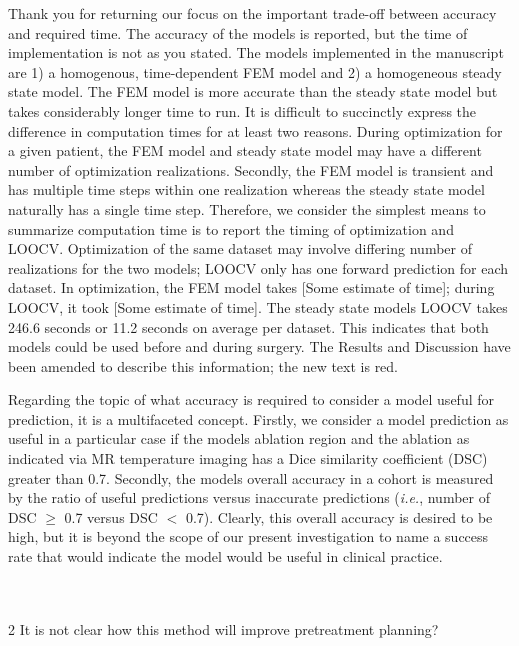 \documentclass[letterpaper,12pt]{report}
\begin{document}
{\color{red}Thank you for returning our focus on the important
trade-off between accuracy and required time.
The accuracy of the models is reported, but the time of implementation
is not as you stated. The models implemented in the manuscript are 1) a homogenous,
time-dependent FEM model and 2) a homogeneous steady state model. The
FEM model is more accurate than the steady state model but takes considerably longer time
to run. It is difficult to succinctly express the difference in
computation times for at least two
reasons. During optimization for a given patient,
the FEM model and steady state model may have a different
number of optimization realizations. Secondly, the FEM model is transient and has multiple time steps within
one realization whereas the steady state model naturally has a single time step. Therefore, we
consider the simplest means to summarize computation time is to report the timing of optimization and LOOCV.
Optimization of the same dataset may involve differing number of realizations for the two models; LOOCV only
has one forward prediction for each dataset. In optimization, the FEM model takes {\color{green}[Some estimate of time]}; during LOOCV, it took
{\color{green}[Some estimate of time]}. The steady
state models LOOCV takes 246.6 seconds or 11.2 seconds on average per dataset. This indicates that both models
could be used before and during surgery. The Results
and Discussion have been amended to describe this
information; the new text is red.

Regarding the topic of what accuracy is required to consider a model useful for prediction, it is a
multifaceted concept. Firstly, we consider a model prediction as useful in a particular case if the models ablation region and the ablation as indicated
via MR temperature imaging has a Dice similarity coefficient (DSC) greater than 0.7. Secondly, the models overall accuracy in a cohort is measured by the
ratio of useful predictions versus inaccurate predictions (\textit{i.e.}, number of DSC $\geq$ 0.7 versus DSC
$<$ 0.7). Clearly, this overall accuracy is desired to be high, but it is beyond the scope of our present investigation to name a success rate that would indicate the model would be useful in clinical practice.
}\\
\\
2	It is not clear how this method will improve pretreatment planning?
\end{document}
